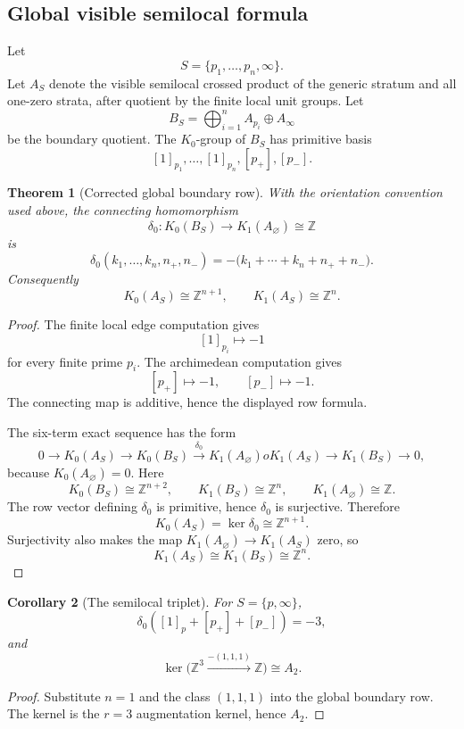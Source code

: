 \documentclass[11pt]{amsart}
\newtheorem{theorem}{Theorem}[section]
\newtheorem{corollary}[theorem]{Corollary}
\newcommand{\ZZ}{\mathbb Z}
\begin{document}
\subsection{Global visible semilocal formula}

Let
\[
       S=\{p_1,\ldots,p_n,\infty\}.
\]
Let $A_S$ denote the visible semilocal crossed product of the generic stratum and all one-zero strata, after quotient by the finite local unit groups.  Let
\[
       B_S=\bigoplus_{i=1}^n A_{p_i}\oplus A_\infty
\]
be the boundary quotient.  The $K_0$-group of $B_S$ has primitive basis
\[
       [1]_{p_1},\ldots,[1]_{p_n},[p_+],[p_-].
\]

\begin{theorem}[Corrected global boundary row]
With the orientation convention used above, the connecting homomorphism
\[
       \delta_0:K_0(B_S)\to K_1(A_\varnothing)\cong\ZZ
\]
is
\[
       \delta_0(k_1,\ldots,k_n,n_+,n_-)
       =-\big(k_1+\cdots+k_n+n_++n_-\big).
\]
Consequently
\[
       K_0(A_S)\cong\ZZ^{n+1},
       \qquad
       K_1(A_S)\cong\ZZ^n.
\]
\end{theorem}

\begin{proof}
The finite local edge computation gives
\[
       [1]_{p_i}\mapsto -1
\]
for every finite prime $p_i$.  The archimedean computation gives
\[
       [p_+]\mapsto -1,
       \qquad
       [p_-]\mapsto -1.
\]
The connecting map is additive, hence the displayed row formula.

The six-term exact sequence has the form
\[
       0\to K_0(A_S)\to K_0(B_S)\xrightarrow{\delta_0}K_1(A_\varnothing)	o K_1(A_S)\to K_1(B_S)\to0,
\]
because $K_0(A_\varnothing)=0$.  Here
\[
       K_0(B_S)\cong\ZZ^{n+2},
       \qquad
       K_1(B_S)\cong\ZZ^n,
       \qquad
       K_1(A_\varnothing)\cong\ZZ.
\]
The row vector defining $\delta_0$ is primitive, hence $\delta_0$ is surjective.  Therefore
\[
       K_0(A_S)=\ker\delta_0\cong\ZZ^{n+1}.
\]
Surjectivity also makes the map $K_1(A_\varnothing)\to K_1(A_S)$ zero, so
\[
       K_1(A_S)\cong K_1(B_S)\cong\ZZ^n.
\]
\end{proof}

\begin{corollary}[The semilocal triplet]
For $S=\{p,\infty\}$,
\[
       \delta_0([1]_p+[p_+]+[p_-])=-3,
\]
and
\[
       \ker\big(\ZZ^3\xrightarrow{-(1,1,1)}\ZZ\big)\cong A_2.
\]
\end{corollary}

\begin{proof}
Substitute $n=1$ and the class $(1,1,1)$ into the global boundary row.  The kernel is the $r=3$ augmentation kernel, hence $A_2$.\end{proof}
\end{document}
